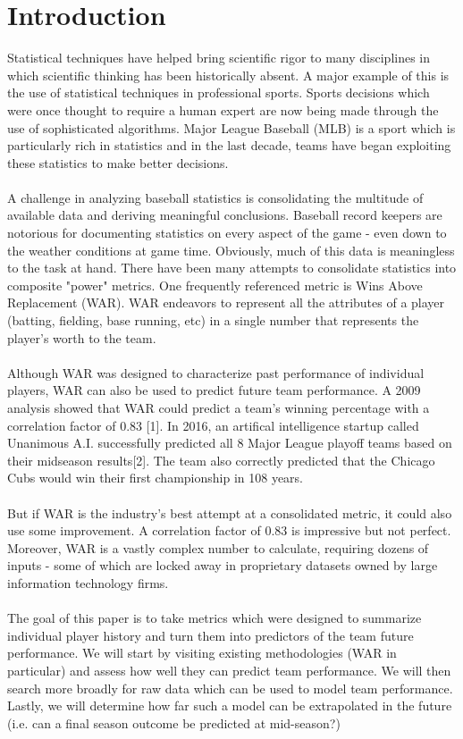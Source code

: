 \documentclass{article} %
\begin{document}
\section{Introduction}
Statistical techniques have helped bring scientific rigor to many disciplines in which scientific thinking has been historically absent. A major example of this is the use of statistical techniques in professional sports. Sports decisions which were once thought to require a human expert are now being made through the use of sophisticated algorithms.  Major League Baseball (MLB) is a sport which is particularly rich in statistics and in the last decade, teams have began exploiting these statistics to make better decisions.  \\
\\
A challenge in analyzing baseball statistics is consolidating the multitude of available data and deriving meaningful conclusions.  Baseball record keepers are notorious for documenting statistics on every aspect of the game - even down to the weather conditions at game time.  Obviously, much of this data is meaningless to the task at hand.  There have been many attempts to consolidate statistics into composite "power" metrics.  One frequently referenced metric is Wins Above Replacement (WAR).  WAR endeavors to represent all the attributes of a player (batting, fielding, base running, etc) in a single number that represents the player's worth to the team. \\
\\
Although WAR was designed to characterize past performance of individual players, WAR can also be used to predict future team performance.  A 2009 analysis showed that WAR could predict a team's winning percentage with a correlation factor of 0.83 [1].  In 2016, an artifical intelligence startup called Unanimous A.I. successfully predicted all 8 Major League playoff teams based on their midseason results[2]. The team also correctly predicted that the Chicago Cubs would win their first championship in 108 years. \\ 
\\
But if WAR is the industry's best attempt at a consolidated metric, it could also use some improvement.  A correlation factor of 0.83 is impressive but not perfect.  Moreover, WAR is a vastly complex number to calculate, requiring dozens of inputs - some of which are locked away in proprietary datasets owned by large information technology firms.   \\
\\
The goal of this paper is to take metrics which were designed to summarize individual player history and turn them into predictors of the team future performance. We will start by visiting existing methodologies (WAR in particular) and assess how well they can predict team performance.  We will then search more broadly for raw data which can be used to model team performance. Lastly, we will determine how far such a model can be extrapolated in the future (i.e. can a final season outcome be predicted at mid-season?)
\end{document}
